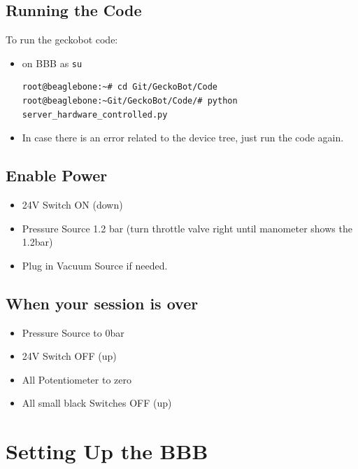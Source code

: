 \documentclass[
	fontsize=10pt
	paper=a4
]{scrartcl}
\begin{document}
\subsection{Running the Code}
To run the geckobot code:
\begin{itemize}
\item on BBB as \texttt{su}
\begin{lstlisting}
root@beaglebone:~# cd Git/GeckoBot/Code
root@beaglebone:~Git/GeckoBot/Code/# python server_hardware_controlled.py
\end{lstlisting}

\item In case there is an error related to the device tree, just run the code again.

\end{itemize}




\subsection{Enable Power}

\begin{itemize}

\item 24V Switch ON (down)
\item Pressure Source 1.2 bar (turn throttle valve right until manometer shows the 1.2bar)
\item Plug in Vacuum Source if needed.

\end{itemize}



\subsection{When your session is over}

\begin{itemize}

\item Pressure Source to 0bar
\item 24V Switch OFF (up)
\item All Potentiometer to zero
\item All small black Switches OFF (up)



\end{itemize}




\section{Setting Up the BBB}
\end{document}
